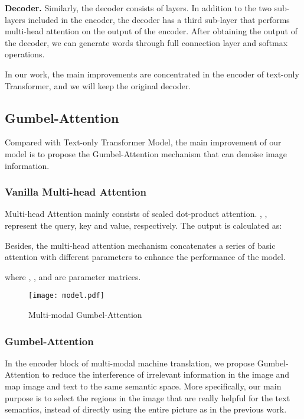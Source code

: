 \documentclass{article}
\begin{document}
\textbf{Decoder.} Similarly, the decoder consists of  layers. In addition to the two sub-layers included in the encoder, the decoder has a third sub-layer that performs multi-head attention on the output of the encoder. After obtaining the output  of the decoder, we can generate words through full connection layer and softmax operations. 

In our work, the main improvements are concentrated in the encoder of text-only Transformer, and we will keep the original decoder.


\subsection{Gumbel-Attention}
Compared with Text-only Transformer Model, the main improvement of our model is to propose the Gumbel-Attention mechanism that can denoise image information.  

\subsubsection{Vanilla Multi-head Attention}
Multi-head Attention mainly consists of scaled dot-product attention. , ,  represent the query, key and value, respectively. The output is calculated as:



Besides, the multi-head attention mechanism concatenates a series of basic attention with different parameters to enhance the performance of the model.



where , ,  and  are parameter matrices.

\begin{figure}[t]
\centering\texttt{[image: model.pdf]}
	\footnotesize\caption{Multi-modal Gumbel-Attention} 
	\label{fig:02}
\end{figure}

\subsubsection{Gumbel-Attention}
In the encoder block of multi-modal machine translation, we propose Gumbel-Attention to reduce the interference of irrelevant information in the image and map image and text to the same semantic space. More specifically, our main purpose is to select the regions in the image that are really helpful for the text semantics, instead of directly using the entire picture as in the previous work. 
\end{document}
